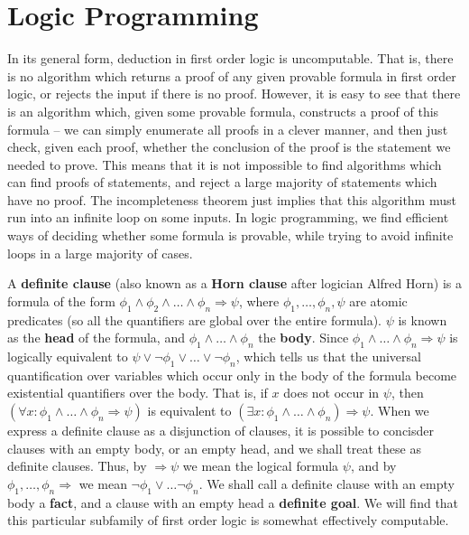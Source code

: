 \section{Logic Programming}

In its general form, deduction in first order logic is uncomputable. That is, there is no algorithm which returns a proof of any given provable formula in first order logic, or rejects the input if there is no proof. However, it is easy to see that there is an algorithm which, given some provable formula, constructs a proof of this formula -- we can simply enumerate all proofs in a clever manner, and then just check, given each proof, whether the conclusion of the proof is the statement we needed to prove. This means that it is not impossible to find algorithms which can find proofs of statements, and reject a large majority of statements which have no proof. The incompleteness theorem just implies that this algorithm must run into an infinite loop on some inputs. In logic programming, we find efficient ways of deciding whether some formula is provable, while trying to avoid infinite loops in a large majority of cases.

A {\bf definite clause} (also known as a {\bf Horn clause} after logician Alfred Horn) is a formula of the form $\phi_1 \wedge \phi_2 \wedge \dots \wedge \phi_n \Rightarrow \psi$, where $\phi_1, \dots, \phi_n, \psi$ are atomic predicates (so all the quantifiers are global over the entire formula). $\psi$ is known as the {\bf head} of the formula, and $\phi_1 \wedge \dots \wedge \phi_n$ the {\bf body}. Since $\phi_1 \wedge \dots \wedge \phi_n \Rightarrow \psi$ is logically equivalent to $\psi \vee \neg \phi_1 \vee \dots \vee \neg \phi_n$, which tells us that the universal quantification over variables which occur only in the body of the formula become existential quantifiers over the body. That is, if $x$ does not occur in $\psi$, then $(\forall x: \phi_1 \wedge \dots \wedge \phi_n \Rightarrow \psi)$ is equivalent to $(\exists x: \phi_1 \wedge \dots \wedge \phi_n) \Rightarrow \psi$. When we express a definite clause as a disjunction of clauses, it is possible to concisder clauses with an empty body, or an empty head, and we shall treat these as definite clauses. Thus, by $\Rightarrow \psi$ we mean the logical formula $\psi$, and by $\phi_1, \dots, \phi_n \Rightarrow$ we mean $\neg \phi_1 \vee \dots \neg \phi_n$. We shall call a definite clause with an empty body a {\bf fact}, and a clause with an empty head a {\bf definite goal}. We will find that this particular subfamily of first order logic is somewhat effectively computable.

